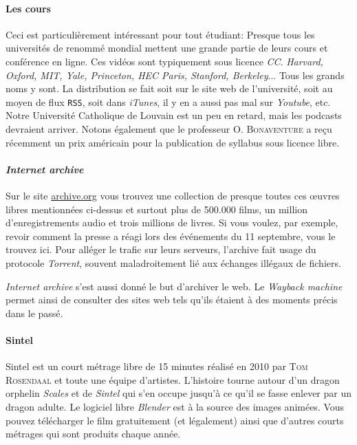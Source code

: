 \paragraph{Les cours}
Ceci est particulièrement intéressant pour tout étudiant: Presque tous les universités de renommé mondial mettent une grande partie de leurs cours et conférence en ligne.
Ces vidéos sont typiquement sous licence \textit{CC}. \textit{Harvard, Oxford, MIT, Yale, Princeton, HEC Paris, Stanford, Berkeley}... Tous les grands noms y sont.
La distribution se fait soit sur le site web de l'université, soit au moyen de flux \texttt{RSS}, soit dans \textit{iTunes}, il y en a aussi pas mal sur \textit{Youtube}, etc.
Notre Université Catholique de Louvain est un peu en retard, mais les podcasts devraient arriver.
Notons également que le professeur O. \textsc{Bonaventure} a reçu récemment un prix américain pour la publication de syllabus sous licence libre. %

\paragraph{\textit{Internet archive}}
Sur le site \url{archive.org} vous trouvez une collection de presque toutes ces \oe uvres libres mentionnées ci-dessus et surtout plus de 500.000 films, un million d’enregistrements audio et trois millions de livres.
Si vous voulez, par exemple, revoir comment la presse a réagi lors des événements du 11 septembre, vous le trouvez ici.
Pour alléger le trafic sur leurs serveurs, l'archive fait usage du protocole \textit{Torrent}, souvent maladroitement lié aux échanges illégaux de fichiers.

\textit{Internet archive} s'est aussi donné le but d'archiver le web. Le \textit{Wayback machine} permet ainsi de consulter des sites web tels qu'ils étaient à des moments précis dans le passé.

\paragraph{Sintel}
Sintel est un court métrage libre de 15 minutes réalisé en 2010 par \textsc{Tom Rosendaal} et toute une équipe d'artistes.
L'histoire tourne autour d'un dragon orphelin \textit{Scales} et de \textit{Sintel} qui s'en occupe jusqu'à ce qu'il se fasse enlever par un dragon adulte.
Le logiciel libre \textit{Blender} est à la source des images animées.
Vous pouvez télécharger le film gratuitement (et légalement) ainsi que d'autres courts métrages qui sont produits chaque année.


	
		
	
